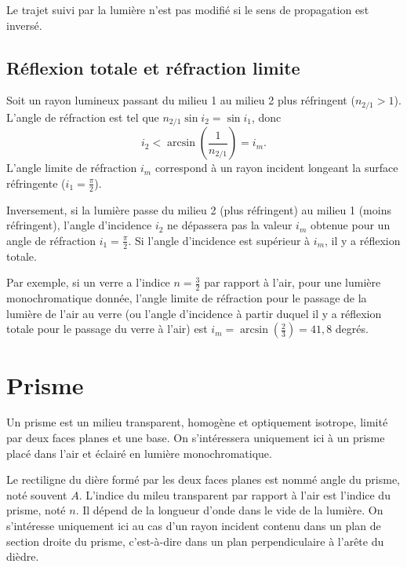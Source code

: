 \begin{theo}
  Le trajet suivi par la lumière n'est pas modifié si le sens de propagation est inversé.
\end{theo}

\subsection{Réflexion totale et réfraction limite}
\label{chap6-subsec:reftotale}
Soit un rayon lumineux passant du milieu 1 au milieu 2 plus réfringent ($n_{2/1}>1$). L'angle de réfraction est tel que $n_{2/1} \sin i_2 = \sin i_1$, donc
\begin{equation}
  i_2 < \arcsin \left(\frac{1}{n_{2/1}} \right) = i_m.
\end{equation}
L'angle limite de réfraction $i_m$ correspond à un rayon incident longeant la surface réfringente ($i_1 = \frac{\pi}{2}$).

Inversement, si la lumière passe du milieu 2 (plus réfringent) au milieu 1 (moins réfringent), l'angle d'incidence $i_2$ ne dépassera pas la valeur $i_m$ obtenue pour un angle de réfraction $i_1 = \frac{\pi}{2}$. Si l'angle d'incidence est supérieur à $i_m$, il y a réflexion totale.

Par exemple, si un verre a l'indice $n=\frac{3}{2}$ par rapport à l'air, pour une lumière monochromatique donnée, l'angle limite de réfraction pour le passage de la lumière de l'air au verre (ou l'angle d'incidence à partir duquel il y a réflexion totale pour le passage du verre à l'air) est $i_m = \arcsin\left(\frac{2}{3}\right) = 41,8$
 degrés.
\section{Prisme}
\label{chap6-sec:prisme}

Un prisme est un milieu transparent, homogène et optiquement isotrope, limité par deux faces planes et une base. On s'intéressera uniquement ici à un prisme placé dans l'air et éclairé en lumière monochromatique.

Le rectiligne du dière formé par les deux faces planes est nommé angle du prisme, noté souvent $A$. L'indice du mileu transparent par rapport à l'air est l'indice du prisme, noté $n$. Il dépend de la longueur d'onde dans le vide de la lumière. On s'intéresse uniquement ici au cas d'un rayon incident contenu dans un plan de section droite du prisme, c'est-à-dire dans un plan perpendiculaire à l'arête du dièdre.

